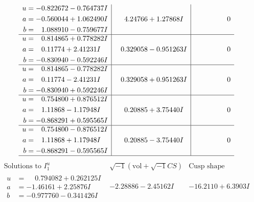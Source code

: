 \documentclass[1p]{elsarticle_modified}
\theoremstyle{definition}
\newcommand{\I}{\sqrt{-1}}
\begin{document}
$$\begin{array}{c|c|c}
\begin{aligned}
u &= -0.822672 - 0.764737 I \\
a &= -0.560044 + 1.062490 I \\
b &= \phantom{-}1.088910 - 0.759677 I\end{aligned}
 & \phantom{-}4.24766 + 1.27868 I & \phantom{-0.000000 } 0 \\ \hline\begin{aligned}
u &= \phantom{-}0.814865 + 0.778282 I \\
a &= \phantom{-}0.11774 + 2.41231 I \\
b &= -0.830940 - 0.592246 I\end{aligned}
 & \phantom{-}0.329058 - 0.951263 I & \phantom{-0.000000 } 0 \\ \hline\begin{aligned}
u &= \phantom{-}0.814865 - 0.778282 I \\
a &= \phantom{-}0.11774 - 2.41231 I \\
b &= -0.830940 + 0.592246 I\end{aligned}
 & \phantom{-}0.329058 + 0.951263 I & \phantom{-0.000000 } 0 \\ \hline\begin{aligned}
u &= \phantom{-}0.754800 + 0.876512 I \\
a &= \phantom{-}1.11868 - 1.17948 I \\
b &= -0.868291 + 0.595565 I\end{aligned}
 & \phantom{-}0.20885 + 3.75440 I & \phantom{-0.000000 } 0 \\ \hline\begin{aligned}
u &= \phantom{-}0.754800 - 0.876512 I \\
a &= \phantom{-}1.11868 + 1.17948 I \\
b &= -0.868291 - 0.595565 I\end{aligned}
 & \phantom{-}0.20885 - 3.75440 I & \phantom{-0.000000 } 0\\
 \hline 
 \end{array}$$\newpage$$\begin{array}{c|c|c}  
\text{Solutions to }I^u_{1}& \I (\text{vol} + \sqrt{-1}CS) & \text{Cusp shape}\\
 \hline 
\begin{aligned}
u &= \phantom{-}0.794082 + 0.262125 I \\
a &= -1.46161 + 2.25876 I \\
b &= -0.977760 - 0.341426 I\end{aligned}
 & -2.28886 - 2.45162 I & -16.2110 + 6.3903 I \\ \hline\begin{aligned}

\end{aligned}
\end{array}$$
\end{document}
